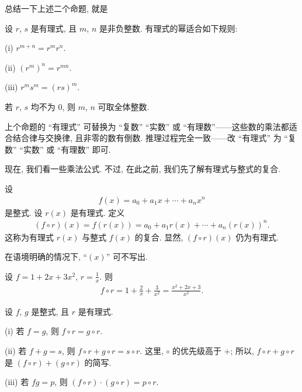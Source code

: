 总结一下上述二个命题, 就是
\begin{proposition}
    设 $r$, $s$ 是有理式, 且 $m$, $n$ 是非负整数. 有理式的幂适合如下规则:

    (i) $r^{m+n} = r^m r^n$.

    (ii) $(r^m)^n = r^{mn}$.

    (iii) $r^m s^m = (rs)^m$.

    若 $r$, $s$ 均不为 $0$, 则 $m$, $n$ 可取全体整数.
\end{proposition}

\begin{remark}
    上个命题的 ``有理式'' 可替换为 ``复数'' ``实数'' 或 ``有理数''——这些数的乘法都适合结合律与交换律, 且非零的数有倒数. 推理过程完全一致——改 ``有理式'' 为 ``复数'' ``实数'' 或 ``有理数'' 即可.
\end{remark}

现在, 我们看一些乘法公式. 不过, 在此之前, 我们先了解有理式与整式的复合.

\begin{definition}
    设
    \begin{align*}
        f(x) = a_0 + a_1 x + \cdots + a_n x^n
    \end{align*}
    是整式. 设 $r(x)$ 是有理式. 定义
    \begin{align*}
        (f \circ r)(x) = f(r(x)) = a_0 + a_1 r(x) + \cdots + a_n (r(x))^n.
    \end{align*}
    这称为有理式 $r(x)$ 与整式 $f(x)$ 的复合. 显然, $(f \circ r)(x)$ 仍为有理式.

    在语境明确的情况下, ``$(x)$'' 可不写出.
\end{definition}

\begin{example}
    设 $f = 1 + 2x + 3x^2$, $r = \frac{1}{x}$. 则
    \begin{align*}
        f \circ r = 1 + \frac{2}{x} + \frac{3}{x^2} = \frac{x^2 + 2x + 3}{x^2}.
    \end{align*}
\end{example}

\begin{proposition}
    设 $f$, $g$ 是整式, 且 $r$ 是有理式.

    (i) 若 $f = g$, 则 $f \circ r = g \circ r$.

    (ii) 若 $f + g = s$, 则 $f \circ r + g \circ r = s \circ r$. 这里, $\circ$ 的优先级高于 $+$; 所以, $f \circ r + g \circ r$ 是 $(f \circ r) + (g \circ r)$ 的简写.

    (iii) 若 $fg = p$, 则 $(f \circ r) \cdot (g \circ r) = p \circ r$.
\end{proposition}

